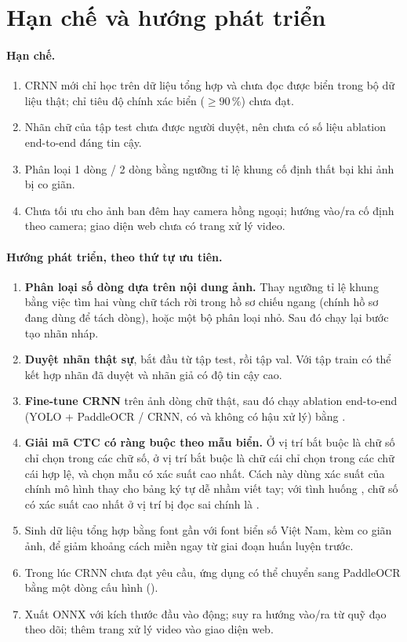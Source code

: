 \section{Hạn chế và hướng phát triển}\label{sec:limit}

\paragraph{Hạn chế.}
\begin{enumerate}[nosep]
  \item CRNN mới chỉ học trên dữ liệu tổng hợp và chưa đọc được biển trong bộ dữ liệu thật; chỉ tiêu độ chính xác biển ($\geq 90\,\%$) chưa đạt.
  \item Nhãn chữ của tập test chưa được người duyệt, nên chưa có số liệu ablation end-to-end đáng tin cậy.
  \item Phân loại 1 dòng / 2 dòng bằng ngưỡng tỉ lệ khung cố định thất bại khi ảnh bị co giãn.
  \item Chưa tối ưu cho ảnh ban đêm hay camera hồng ngoại; hướng vào/ra cố định theo camera; giao diện web chưa có trang xử lý video.
\end{enumerate}

\paragraph{Hướng phát triển, theo thứ tự ưu tiên.}
\begin{enumerate}[nosep]
  \item \textbf{Phân loại số dòng dựa trên nội dung ảnh.} Thay ngưỡng tỉ lệ khung bằng việc tìm hai vùng chữ tách rời trong hồ sơ chiếu ngang (chính hồ sơ đang dùng để tách dòng), hoặc một bộ phân loại nhỏ. Sau đó chạy lại bước tạo nhãn nháp.
  \item \textbf{Duyệt nhãn thật sự}, bắt đầu từ tập test, rồi tập val. Với tập train có thể kết hợp nhãn đã duyệt và nhãn giả có độ tin cậy cao.
  \item \textbf{Fine-tune CRNN} trên ảnh dòng chữ thật, sau đó chạy ablation end-to-end (YOLO + PaddleOCR / CRNN, có và không có hậu xử lý) bằng .
  \item \textbf{Giải mã CTC có ràng buộc theo mẫu biển.} Ở vị trí bắt buộc là chữ số chỉ chọn trong các chữ số, ở vị trí bắt buộc là chữ cái chỉ chọn trong các chữ cái hợp lệ, và chọn mẫu có xác suất cao nhất. Cách này dùng xác suất của chính mô hình thay cho bảng ký tự dễ nhầm viết tay; với tình huống , chữ số có xác suất cao nhất ở vị trí bị đọc sai chính là .
  \item Sinh dữ liệu tổng hợp bằng font gần với font biển số Việt Nam, kèm co giãn ảnh, để giảm khoảng cách miền ngay từ giai đoạn huấn luyện trước.
  \item Trong lúc CRNN chưa đạt yêu cầu, ứng dụng có thể chuyển sang PaddleOCR bằng một dòng cấu hình ().
  \item Xuất ONNX với kích thước đầu vào động; suy ra hướng vào/ra từ quỹ đạo theo dõi; thêm trang xử lý video vào giao diện web.
\end{enumerate}

